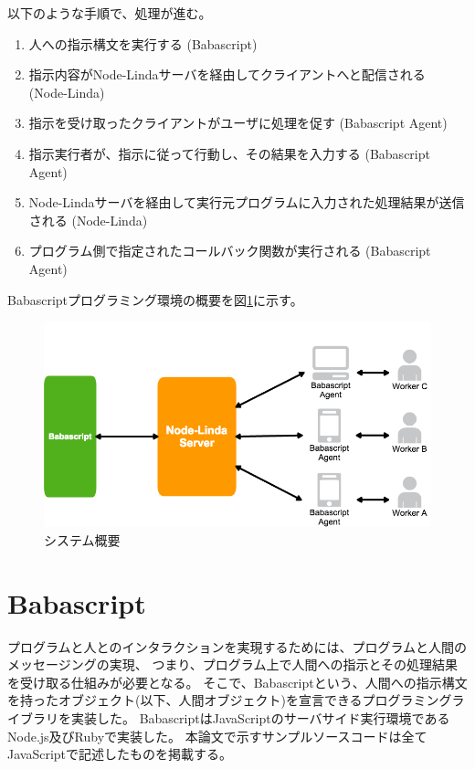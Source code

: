 以下のような手順で、処理が進む。

\begin{enumerate}
\def\labelenumi{\arabic{enumi}.}
\itemsep1pt\parskip0pt
\item
  人への指示構文を実行する (Babascript)
\item
  指示内容がNode-Lindaサーバを経由してクライアントへと配信される
  (Node-Linda)
\item
  指示を受け取ったクライアントがユーザに処理を促す (Babascript Agent)
\item
  指示実行者が、指示に従って行動し、その結果を入力する (Babascript
  Agent)
\item
  Node-Lindaサーバを経由して実行元プログラムに入力された処理結果が送信される
  (Node-Linda)
\item
  プログラム側で指定されたコールバック関数が実行される (Babascript
  Agent)
\end{enumerate}

Babascriptプログラミング環境の概要を図\ref{fig:system_image}に示す。

\begin{figure}[htbp]
  \begin{center}
  \includegraphics[width=.7\linewidth,bb=0 0 834 443]{images/overview.png}
  \end{center}
  \caption{システム概要}
  \label{fig:system_image}
\end{figure}

\section{Babascript}\label{babascript}

プログラムと人とのインタラクションを実現するためには、プログラムと人間のメッセージングの実現、
つまり、プログラム上で人間への指示とその処理結果を受け取る仕組みが必要となる。
そこで、Babascriptという、人間への指示構文を持ったオブジェクト(以下、人間オブジェクト)を宣言できるプログラミングライブラリを実装した。
BabascriptはJavaScriptのサーバサイド実行環境であるNode.js及びRubyで実装した。
本論文で示すサンプルソースコードは全てJavaScriptで記述したものを掲載する。


